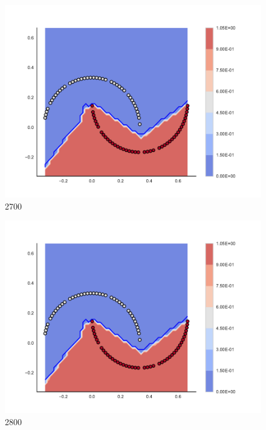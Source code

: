 \begin{subfigure}[b]{0.09\textwidth}
    \includegraphics[clip, trim=2.35cm 1.75cm 4.5cm 0cm,width=\textwidth]{img/convergence/2700.pdf}
    \caption{2700}
    \label{fig:convergence_2700}
\end{subfigure}
%
\begin{subfigure}[b]{0.09\textwidth}
    \includegraphics[clip, trim=2.35cm 1.75cm 4.5cm 0cm,width=\textwidth]{img/convergence/2800.pdf}
    \caption{2800}
    \label{fig:convergence_2800}
\end{subfigure}
%
